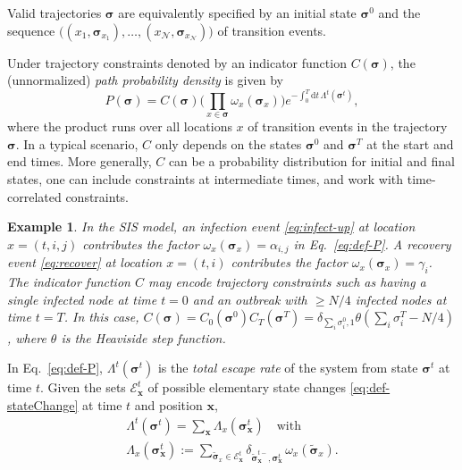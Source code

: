 \documentclass[english,10pt,aps,pra,twocolumn,superscriptaddress,floatfix,fleqn]{revtex4-2}
\newcommand{\ud}{\mathrm{d}}
\newcommand{\mc}[1]{\mathcal{#1}}
\renewcommand{\vec}[1]{{\boldsymbol{#1}}}
\newcommand{\E} {\mc{E}}
\newcommand{\vs}{\vec{\sigma}}
\newcommand{\vx}{\vec{x}}
\newcommand{\Np}{\mc{N}}
\newtheorem{example}{Example}
\begin{document}
Valid trajectories $\vs$ are equivalently specified by an initial state $\vs^0$ and the sequence $\big((x_1,\vs_{x_1}),\dotsc,(x_\Np,\vs_{x_\Np})\big)$ of transition events.

Under trajectory constraints denoted by an indicator function $C(\vs)$, the (unnormalized) \emph{path probability density} is given by
\begin{equation}\label{eq:def-P}
	P(\vs) = C(\vs) \Big(\prod_{x\in\vs}\omega_x(\vs_x)\Big)e^{-\int_0^T\ud t\,\Lambda^t(\vs^t)},
\end{equation}
where the product runs over all locations $x$ of transition events in the trajectory $\vs$.
In a typical scenario, $C$ only depends on the states $\vs^0$ and $\vs^T$ at the start and end times. More generally, $C$ can be a probability distribution for initial and final states, one can include constraints at intermediate times, and work with time-correlated constraints.

\begin{example}
In the SIS model, an infection event \eqref{eq:infect-up} at location $x=(t,i,j)$ contributes the factor $\omega_x(\vs_x)=\alpha_{i,j}$ in Eq.~\eqref{eq:def-P}. A recovery event \eqref{eq:recover} at location $x=(t,i)$ contributes the factor $\omega_x(\vs_x)=\gamma_i$. The indicator function $C$ may encode trajectory constraints such as having a single infected node at time $t=0$ and an outbreak with $\geq N/4$ infected nodes at time $t=T$. In this case, $C(\vs)=C_0(\vs^0)C_T(\vs^T)=\delta_{\sum_i\sigma_i^0,1}\theta(\sum_i\sigma_i^T-N/4)$, where $\theta$ is the Heaviside step function.
\end{example}

In Eq.~\eqref{eq:def-P}, $\Lambda^t(\vs^t)$ is the \emph{total escape rate} of the system from state $\vs^t$ at time $t$. Given the sets $\E_\vx^t$ of possible elementary state changes \eqref{eq:def-stateChange} at time $t$ and position $\vx$,
\begin{subequations}\label{eq:def-Lambda}
\begin{gather}\label{eq:def-Lambda-total}
	\Lambda^t(\vs^t)=\sum_\vx \Lambda_x(\vs_\vx^t)\quad\text{with}\\
	\Lambda_x(\vs_\vx^t):=\sum_{\tilde{\vs}_x\in\E_\vx^t}\delta_{\tilde{\vs}_\vx^{t-},\vs_\vx^t}\,\omega_x(\tilde{\vs}_x).
\end{gather}
\end{subequations}
\end{document}

